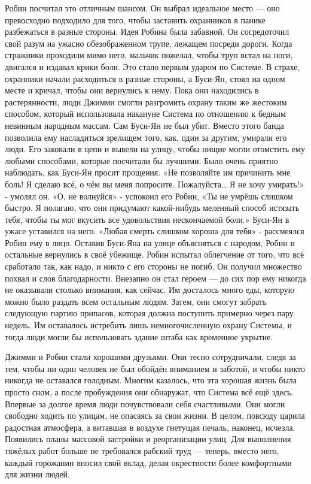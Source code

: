 \documentclass[a4paper,12pt]{book}
\begin{document}
	Робин посчитал это отличным шансом. Он выбрал идеальное место — оно превосходно подходило для того, чтобы заставить охранников в панике разбежаться в разные стороны. Идея Робина была забавной. Он сосредоточил свой разум на ужасно обезображенном трупе, лежащем посреди дороги. Когда стражники проходили мимо него, мальчик пожелал, чтобы труп встал на ноги, двигался и издавал крики боли. Это стало первым ударом по Системе. В страхе, охранники начали расходиться в разные стороны, а Буси-Ян, стоял на одном месте и кричал, чтобы они вернулись к нему. Пока они находились в растерянности, люди Джимми смогли разгромить охрану таким же жестоким способом, который использовала накануне Система по отношению к бедным невинным народным массам.
	Сам Буси-Ян не был убит. Вместо этого банда позволила ему насладиться зрелищем того, как, один за другим, умирали его люди. Его заковали в цепи и вывели на улицу, чтобы нищие могли отомстить ему любыми способами, которые посчитали бы лучшими. Было очень приятно наблюдать, как Буси-Ян просит прощения.
	«Не позволяйте им причинить мне боль! Я сделаю всё, о чём вы меня попросите. Пожалуйста… Я не хочу умирать!» - умолял он.
	«О, не волнуйся» - успокоил его Робин,
	«Ты не умрёшь слишком быстро. Я полагаю, что они придумают какой-нибудь меленный способ истязать тебя, чтобы ты мог вкусить все удовольствия нескончаемой боли.»
	Буси-Ян в ужасе уставился на него.
	«Любая смерть слишком хороша для тебя» - рассмеялся Робин ему в лицо.
	Оставив Буси-Яна на улице объясняться с народом, Робин и остальные вернулись в своё убежище.
	Робин испытал облегчение от того, что всё сработало так, как надо, и никто с его стороны не погиб. Он получил множество похвал и слов благодарности.
	Внезапно он стал героем — до сих пор ему никогда не оказывали столько внимания, как сейчас. Им досталось много еды, которую можно было раздать всем остальным людям. Затем, они смогут забрать следующую партию припасов, которая должна поступить примерно через пару недель. Им оставалось истребить лишь немногочисленную охрану Системы, и тогда люди могли бы использовать здание штаба как временное укрытие.

	Джимми и Робин стали хорошими друзьями. Они тесно сотрудничали, следя за тем, чтобы ни один человек не был обойдён вниманием и заботой, и чтобы никто никогда не оставался голодным. Многим казалось, что эта хорошая жизнь была просто сном, а после пробуждения они обнаружат, что Система всё ещё здесь. Впервые за долгое время люди почувствовали себя счастливыми. Они могли свободно ходить по улицам, не опасаясь за свои жизни. В целом, повсюду царила радостная атмосфера, а витавшая в воздухе гнетущая печаль, наконец, исчезла.
	Появились планы массовой застройки и реорганизации улиц. Для выполнения тяжёлых работ больше не требовался рабский труд — теперь, вместо него, каждый горожанин вносил свой вклад, делая окрестности более комфортными для жизни людей. 
\end{document}
